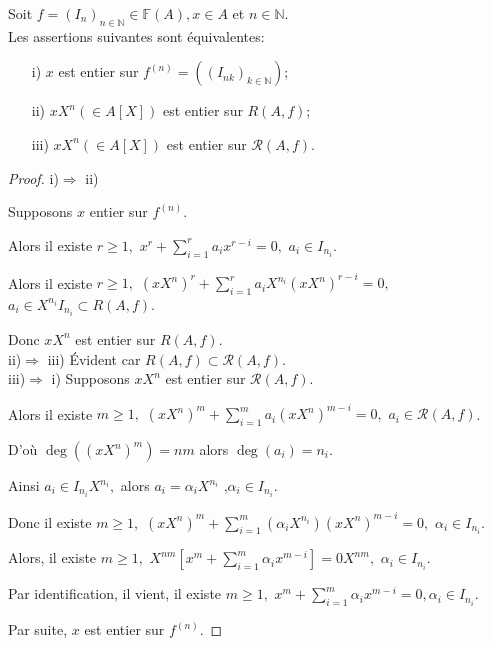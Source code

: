\begin{maproposition}
	\label{maprop1}
	Soit $f=(I_n)_{n \in \mathbb{N}} \in \mathbb{F}(A), x \in A $ et $n \in \mathbb{N}$.\\
	Les assertions suivantes sont équivalentes: \\
	\begin{enumerate}
		\item[i)] $x$ est entier sur $f^{(n)}=((I_{nk})_{k \in \mathbb{N}})$;
		\item[ii)] $xX^n(\in A[X])$ est entier sur $R(A,f)$;
		\item[iii)] $xX^n(\in A[X])$ est entier sur $ \mathcal{R}(A,f)$.
	\end{enumerate}
	\begin{proof}
		i)$\Rightarrow$ ii)
		
		Supposons $x$ entier sur $f^{(n)}$.
		
		Alors il existe $r\geq 1,$ $x^{r}+\sum\limits_{i=1}^{r}a_{i}x^{r-i}=0,$ $a_{i}\in I_{n_{i}}$.
		
		Alors il existe $r\geq 1,$ $(xX^{n})^{r}+\sum
		\limits_{i=1}^{r}a_{i}X^{n_{i}}(xX^{n})^{r-i}=0,$ $a_{i}\in X^{n_{i}}I_{n_{i}}\subset R(A,f)$.
		
		Donc $xX^{n}$ est entier sur $R(A,f).$ \\
		
		ii)$\Rightarrow$ iii) Évident car $R(A,f)\subset \mathcal{R}(A,f).$ \\
		iii)$\Rightarrow$ i) Supposons $xX^{n}$ est entier sur $\mathcal{R}(A,f).$
		
		Alors il existe $m\geq 1,$ $(xX^{n})^{m}+\sum\limits_{i=1}^{m}a_{i}(xX^{n})^{m-i}=0,$ $a_{i}\in \mathcal{R}(A,f)$.
		
		D'où $\deg ((xX^{n})^{m})=nm$ alors $\deg (a_{i})=n_{i}.$
		
		Ainsi $a_{i}\in I_{n_{i}}X^{n_{i}},$ alors $a_{i}=\alpha _{i}X^{n_{i}}$ ,$\alpha _{i}\in I_{n_{i}}$.
		
		Donc il existe $m\geq 1,$ $(xX^{n})^{m}+\sum\limits_{i=1}^{m}(\alpha
		_{i}X^{n_{i}})(xX^{n})^{m-i}=0,$ $\alpha _{i}\in I_{n_{i}}$.
		
		Alors, il existe $m\geq 1,$ $X^{nm}[x^{m}+\sum\limits_{i=1}^{m}\alpha
		_{i}x^{m-i}]=0X^{nm},$ $\alpha _{i}\in I_{n_{i}}$.
		
		Par identification, il vient, il existe $m\geq 1,$ $ x^{m}+\sum\limits_{i=1}^{m}\alpha _{i}x^{m-i}=0,\alpha _{i}\in I_{n_{i}}$.
		
		Par suite, $x$ est entier sur $f^{(n)}$.
	\end{proof}
\end{maproposition}
